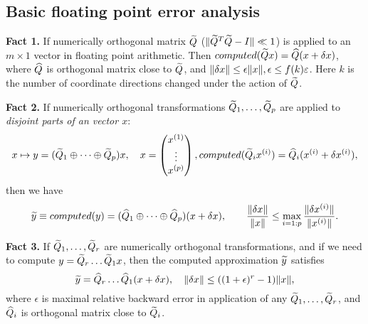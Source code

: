 \documentclass{article}
\begin{document}
\subsection{Basic floating point error analysis}


\textbf{Fact 1.} If numerically orthogonal matrix $\widetilde Q$ ($\|{\widetilde Q^{T} \widetilde
  Q - I}\| \ll 1$) is applied to an $m\times 1$ vector in floating point
arithmetic. Then $computed(\widetilde Q x) = \widehat Q(x+\delta x)$, where $\widehat Q$ is
orthogonal matrix close to $\widetilde Q$, and $\|{\delta x}\| \leq \epsilon
\|{x}\|, \epsilon \leq f(k)\varepsilon $. Here $k$ is the number of
coordinate directions changed under the action of $\widetilde Q$.

\noindent\textbf{Fact 2.} If numerically orthogonal transformations $\widetilde
Q_1,\dots, \widetilde Q_p$ are applied to \emph{disjoint parts of an vector $x$}:
\begin{equation}\notag
  x\mapsto y  = (\widetilde Q_1\oplus \cdots\oplus \widetilde Q_p)x, \quad x = 
  \begin{pmatrix}
    x^{(1)} \\ \vdots \\ x^{(p)}
  \end{pmatrix}, 
computed(\widetilde Q_ix^{(i)}) = \widehat Q_i(x^{(i)} + \delta x^{(i)}),
\end{equation}
then we have 
\begin{equation}\notag
  \widetilde y \equiv computed(y) = (\widehat Q_1\oplus \cdots \oplus \widehat Q_p)(x
  + \delta x), \qquad 
\frac{\|{\delta x}\|}{\|{x}\|} \leq \max_{i = 1:p}\frac{\|{\delta
    x^{(i)}}\|}{\|{x^{(i)}}\|}. 
\end{equation}

\noindent\textbf{Fact 3.} If $\widetilde Q_1,\dots,\widetilde Q_r$ are numerically
orthogonal transformations, and if we need to compute $y = \widetilde Q_r\dots \widetilde
Q_1 x$, then the computed approximation $\widetilde y$ satisfies 
\begin{equation}\notag
  \widetilde y = \widehat Q_r\dots \widehat Q_1(x + \delta x), \quad 
  \|{\delta x}\| \leq ((1+\epsilon)^r - 1)\|{x}\|,
\end{equation}
where $\epsilon$ is maximal relative backward error in application of any
$\widetilde Q_1,\dots,\widetilde Q_r$, and $\widehat Q_i$ is orthogonal matrix close to $\widetilde
Q_i$.
\end{document}
